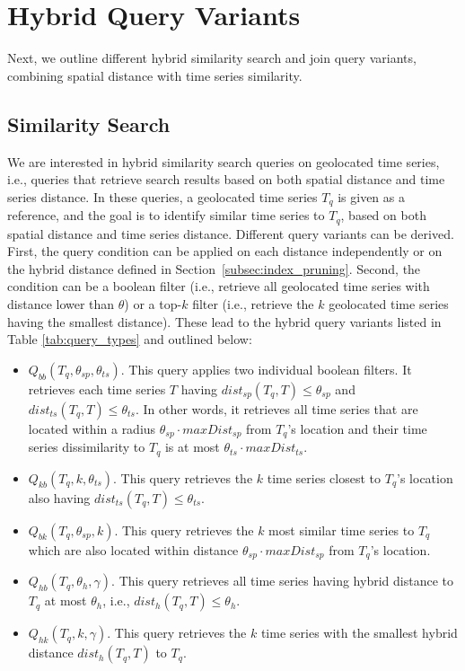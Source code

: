 
\graphicspath{{Papers/SIGSpatial2017/}{Papers/SIGSpatial2018/}}

\section{Hybrid Query Variants}
\label{sec:query_types}

Next, we outline different hybrid similarity search and join query variants, combining spatial distance with time series similarity.

\subsection{Similarity Search}
\label{subsec:sim_serach_prob}
We are interested in hybrid similarity search queries on geolocated time series, i.e., queries that retrieve search results based on both spatial distance and time series distance. In these queries, a geolocated time series $T_q$ is given as a reference, and the goal is to identify similar time series to $T_q$, based on both spatial distance and time series distance. Different query variants can be derived. First, the query condition can be applied on each distance independently or on the hybrid distance defined in Section~\ref{subsec:index_pruning}. Second, the condition can be a boolean filter (i.e., retrieve all geolocated time series with distance lower than $\theta$) or a top-$k$ filter (i.e., retrieve the $k$ geolocated time series having the smallest distance). These lead to the hybrid query variants listed in Table \ref{tab:query_types} and outlined below:

\begin{itemize}
 \item $Q_{bb}(T_q, \theta_{sp}, \theta_{ts})$. This query applies two individual boolean filters. It retrieves each time series $T$ having $dist_{sp}(T_q, T) \leq \theta_{sp}$ and $dist_{ts}(T_q, T) \leq \theta_{ts}$. In other words, it retrieves all time series that are located within a radius $\theta_{sp} \cdot maxDist_{sp}$ from $T_q$'s location and their time series dissimilarity to $T_q$ is at most $\theta_{ts} \cdot maxDist_{ts}$.
 \item $Q_{kb}(T_q, k, \theta_{ts})$. This query retrieves the $k$ time series closest to $T_q$'s location also having $dist_{ts}(T_q, T) \leq \theta_{ts}$.
 \item $Q_{bk}(T_q, \theta_{sp}, k)$. This query retrieves the $k$ most similar time series to $T_q$ which are also located within distance $\theta_{sp} \cdot maxDist_{sp}$ from $T_q$'s location.
 \item $Q_{hb}(T_q, \theta_h, \gamma)$. This query retrieves all time series having hybrid distance to $T_q$ at most $\theta_h$, i.e., $dist_h(T_q, T) \leq \theta_h$.
 \item $Q_{hk}(T_q, k, \gamma)$. This query retrieves the $k$ time series with the smallest hybrid distance $dist_h(T_q, T)$ to $T_q$.
\end{itemize}

